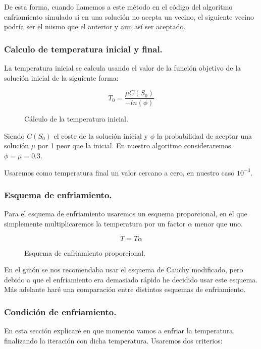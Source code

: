 \documentclass[12pt, spanish]{article}
\begin{document}
De esta forma, cuando llamemos a este método en el código del algoritmo enfriamiento simulado si en una solución no acepta un vecino, el siguiente vecino podría ser el mismo que el anterior y aun así ser aceptado.

\subsubsection{Calculo de temperatura inicial y final.}

La temperatura inicial se calcula usando el valor de la función objetivo de la solución inicial de la siguiente forma:

\begin{figure}[H]
	\centering
	$$ T_0 = \frac{\mu C(S_0)}{-ln(\phi)} $$
	\caption{Cálculo de la temperatura inicial. }
	\label{cTini}
\end{figure}

Siendo $C(S_0)$ el coste de la solución inicial y $\phi$ la probabilidad de aceptar una solución $\mu$ por 1 peor que la inicial. En nuestro algoritmo consideraremos $\phi = \mu = 0.3$.

Usaremos como temperatura final un valor cercano a cero, en nuestro caso $10^{-3}$.

\subsubsection{Esquema de enfriamiento.}

Para el esquema de enfriamiento usaremos un esquema proporcional, en el que simplemente multiplicaremos la temperatura por un factor $\alpha$ menor que uno.

\begin{figure}[H]
	\centering
	$$ T = T \alpha $$
	\caption{Esquema de enfriamiento proporcional. }
	\label{enfriamientoPro}
\end{figure}

En el guión se nos recomendaba usar el esquema de Cauchy modificado, pero debido a que el enfriamiento era demasiado rápido he decidido usar este esquema. Más adelante haré una comparación entre distintos esquemas de enfriamiento.

\subsubsection{Condición de enfriamiento.}

En esta sección explicaré en que momento vamos a enfriar la temperatura, finalizando la iteración con dicha temperatura. Usaremos dos criterios:
\end{document}
